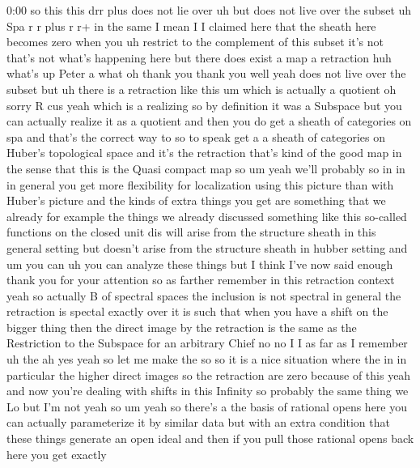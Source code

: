 \begin{unfinished}{0:00}
so  this  this  drr  plus  does
not  lie
over  uh  but  does  not  live  over  the
subset
uh  Spa  r  r
plus  r
r+  in  the  same  I  mean  I  I  claimed  here
that  the  sheath  here  becomes  zero  when
you  uh  restrict  to  the  complement  of
this  subset  it's  not  that's  not  what's
happening  here  but  there  does  exist  a
map  a
retraction  huh  what's  up
Peter  a
what  oh  thank  you  thank  you
well  yeah  does  not  live  over  the  subset
but
uh  there  is  a  retraction  like
this  um  which  is  actually  a
quotient  oh  sorry  R  cus  yeah  which  is  a
realizing  so  by  definition  it  was  a
Subspace  but  you  can  actually  realize  it
as  a
quotient
and  then  you  do  get  a  sheath  of
categories  on  spa  and  that's  the  correct
way  to  so  to  speak  get  a  a  sheath  of
categories  on  Huber's  topological  space
and  it's  the  retraction  that's  kind  of
the  good  map  in  the  sense  that  this  is
the  Quasi  compact  map  so  um  yeah  we'll
probably  so  in  in  in  general  you  get
more  flexibility  for  localization  using
this  picture  than  with  Huber's  picture
and  the  kinds  of  extra  things  you  get
are  something  that  we  already  for
example  the  things  we  already  discussed
something  like  this  so-called  functions
on  the  closed  unit  dis  will  arise  from
the  structure  sheath  in  this  general
setting  but  doesn't  arise  from  the
structure  sheath  in  hubber  setting  and
um  you  can  uh  you  can  analyze  these
things  but  I  think  I've  now  said  enough
thank  you  for  your  attention  so  as
farther  remember  in  this  retraction
context  yeah  so  actually  B  of  spectral
spaces  the  inclusion  is  not  spectral  in
general  the  retraction  is  spectal
exactly  over  it  is  such  that  when  you
have  a  shift  on  the  bigger  thing  then
the  direct  image  by  the  retraction  is
the  same  as  the  Restriction  to  the
Subspace  for  an  arbitrary  Chief  no  no  I
I  as  far  as  I
remember  uh  the  ah  yes  yeah  so  let  me
make  the  so  so  it  is  a  nice  situation
where  the  in  in  particular  the  higher
direct  images  so  the  retraction  are  zero
because  of  this  yeah  and  now  you're
dealing  with  shifts  in  this  Infinity  so
probably  the  same  thing  we  Lo  but  I'm
not  yeah  so
um  yeah  so  there's  a  the  basis  of
rational  opens  here  you  can  actually
parameterize  it  by  similar  data  but  with
an  extra  condition  that  these  things
generate  an  open
ideal  and  then  if  you  pull  those
rational  opens  back  here  you  get  exactly

\end{unfinished}
